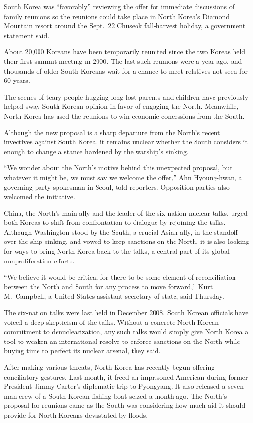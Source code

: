 ﻿\documentclass[12pt]{article}
\begin{document}
South Korea was ``favorably'' reviewing the offer for immediate discussions of family reunions so
the reunions could take place in North Korea's Diamond Mountain resort around the Sept.~22 Chuseok
fall-harvest holiday, a government statement said.

About 20,000 Koreans have been temporarily reunited since the two Koreas held their first summit
meeting in 2000. The last such reunions were a year ago, and thousands of older South Koreans wait
for a chance to meet relatives not seen for 60 years.

The scenes of teary people hugging long-lost parents and children have previously helped sway South
Korean opinion in favor of engaging the North. Meanwhile, North Korea has used the reunions to win
economic concessions from the South.

Although the new proposal is a sharp departure from the North's recent invectives against South
Korea, it remains unclear whether the South considers it enough to change a stance hardened by the
warship's sinking.

``We wonder about the North's motive behind this unexpected proposal, but whatever it might be, we
must say we welcome the offer,'' Ahn Hyoung-hwan, a governing party spokesman in Seoul, told
reporters. Opposition parties also welcomed the initiative.

China, the North's main ally and the leader of the six-nation nuclear talks, urged both Koreas to
shift from confrontation to dialogue by rejoining the talks. Although Washington stood by the South,
a crucial Asian ally, in the standoff over the ship sinking, and vowed to keep sanctions on the
North, it is also looking for ways to bring North Korea back to the talks, a central part of its
global nonproliferation efforts.

``We believe it would be critical for there to be some element of reconciliation between the North
and South for any process to move forward,'' Kurt M.~Campbell, a United States assistant secretary
of state, said Thursday.

The six-nation talks were last held in December 2008. South Korean officials have voiced a deep
skepticism of the talks. Without a concrete North Korean commitment to denuclearization, any such
talks would simply give North Korea a tool to weaken an international resolve to enforce sanctions
on the North while buying time to perfect its nuclear arsenal, they said.

After making various threats, North Korea has recently begun offering conciliatory gestures. Last
month, it freed an imprisoned American during former President Jimmy Carter's diplomatic trip to
Pyongyang. It also released a seven-man crew of a South Korean fishing boat seized a month ago. The
North's proposal for reunions came as the South was considering how much aid it should provide for
North Koreans devastated by floods.
\end{document}
